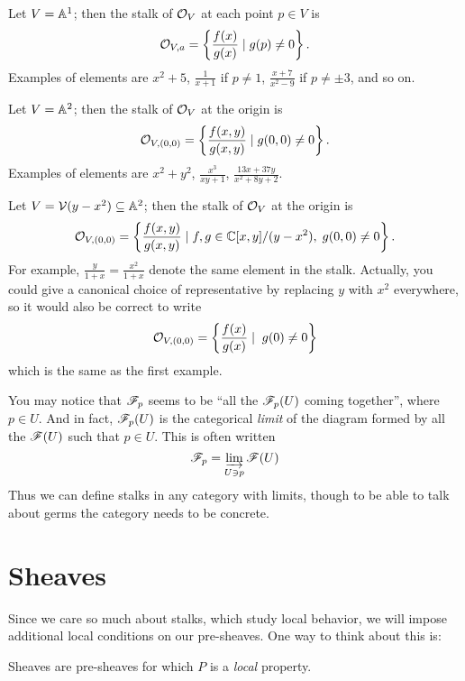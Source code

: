\begin{example}
	\listhack
	\begin{enumerate}[(a)]
		\ii Let $V = \mathbb A^1$; then the stalk of $\mathcal O_V$
		at each point $p \in V$ is
		\[ \mathcal O_{V,a}
			= \left\{ \frac{f(x)}{g(x)} \mid g(p) \ne 0 \right\}. \]
		Examples of elements are $x^2+5$, $\frac{1}{x+1}$ if $p \ne 1$,
		$\frac{x+7}{x^2-9}$ if $p \ne \pm 3$, and so on.

		\ii Let $V = \mathbb A^2$;
		then the stalk of $\mathcal O_V$ at the origin is
		\[ \mathcal O_{V, (0,0)}
			= \left\{ \frac{f(x,y)}{g(x,y)} \mid g(0,0) \ne 0 \right\}. \]
		Examples of elements are $x^2+y^2$,
		$\frac{x^3}{xy+1}$, $\frac{13x+37y}{x^2+8y+2}$.

		\ii Let $V = \mathcal V(y-x^2) \subseteq \mathbb A^2$;
		then the stalk of $\mathcal O_V$ at the origin is
		\[ \mathcal O_{V, (0,0)}
			= \left\{ \frac{f(x,y)}{g(x,y)} \mid f,g \in \mathbb C[x,y] / (y-x^2),
				\; g(0,0) \ne 0 \right\}. \]
		For example, $\frac{y}{1+x} = \frac{x^2}{1+x}$
		denote the same element in the stalk.
		Actually, you could give a canonical choice of representative
		by replacing $y$ with $x^2$ everywhere, so it would also be
		correct to write
		\[ \mathcal O_{V, (0,0)}
			= \left\{ \frac{f(x)}{g(x)} \mid \; g(0) \ne 0 \right\} \]
		which is the same as the first example.
	\end{enumerate}
\end{example}

\begin{remark}
	You may notice that $\mathscr F_p$ seems to be
	``all the $\mathscr F_p(U)$ coming together'', where $p \in U$.
	And in fact, $\mathscr F_p(U)$ is the categorical \emph{limit}
	of the diagram formed by all the $\mathscr F(U)$ such that $p \in U$.
	This is often written
	\[ \mathscr F_p = \varinjlim_{U \ni p} \mathscr F(U) \]
	Thus we can define stalks in any category with limits,
	though to be able to talk about germs the category needs
	to be concrete.
\end{remark}

\section{Sheaves}

Since we care so much about stalks, which study local behavior,
we will impose additional local conditions on our pre-sheaves.
One way to think about this is:
\begin{moral}
	Sheaves are pre-sheaves for which $P$ is a \emph{local} property.
\end{moral}

